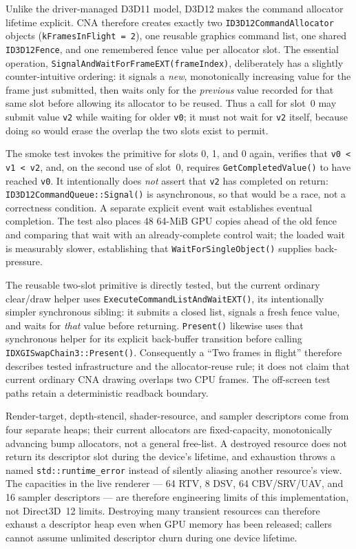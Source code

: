 Unlike the driver-managed D3D11 model, D3D12 makes the command allocator lifetime explicit.
CNA therefore creates exactly two \texttt{ID3D12CommandAllocator} objects
(\texttt{kFramesInFlight = 2}), one reusable graphics command list, one shared
\texttt{ID3D12Fence}, and one remembered fence value per allocator slot.  The essential
operation, \texttt{SignalAndWaitForFrameEXT(\allowbreak{}frameIndex)}, deliberately has a slightly
counter-intuitive ordering: it signals a \emph{new}, monotonically increasing value for the
frame just submitted, then waits only for the \emph{previous} value recorded for that same
slot before allowing its allocator to be reused.  Thus a call for slot~0 may submit value
\texttt{v2} while waiting for older \texttt{v0}; it must not wait for \texttt{v2} itself,
because doing so would erase the overlap the two slots exist to permit.

The smoke test invokes the primitive for slots 0, 1, and 0 again, verifies
that \texttt{v0 < v1 < v2}, and, on the second use of slot~0, requires
\texttt{GetCompletedValue()} to have reached \texttt{v0}.  It intentionally does \emph{not}
assert that \texttt{v2} has completed on return: \texttt{ID3D12CommandQueue::Signal()} is
asynchronous, so that would be a race, not a correctness condition.  A separate explicit
event wait establishes eventual completion. The test also places 48
64-MiB GPU copies ahead of the old fence and comparing that wait with an already-complete
control wait; the loaded wait is measurably slower, establishing that
\texttt{WaitForSingleObject()} supplies back-pressure.

The reusable two-slot primitive is directly tested, but the current ordinary clear/draw helper
uses \texttt{ExecuteCommandListAndWaitEXT()}, its intentionally simpler synchronous sibling:
it submits a closed list, signals a fresh fence value, and waits for \emph{that} value before
returning.  \texttt{Present()} likewise uses that synchronous helper for its explicit
back-buffer transition before calling \texttt{IDXGISwapChain3::Present()}.  Consequently a
``Two frames in flight'' therefore describes tested infrastructure and the allocator-reuse rule;
it does not claim that current ordinary CNA drawing overlaps two CPU frames. The off-screen test
paths retain a deterministic readback boundary.

Render-target,
depth-stencil, shader-resource, and sampler descriptors come from four separate heaps; their
current allocators are fixed-capacity, monotonically advancing bump allocators, not a general
free-list.  A destroyed resource does not return its descriptor slot during the device's
lifetime, and exhaustion throws a named \texttt{std::runtime\_error} instead of silently
aliasing another resource's view.  The capacities in the live renderer --- 64 RTV, 8 DSV,
64 CBV/SRV/UAV, and 16 sampler descriptors --- are therefore engineering limits of this
implementation, not Direct3D~12 limits. Destroying many transient resources can therefore
exhaust a descriptor heap even when GPU memory has been released; callers cannot assume
unlimited descriptor churn during one device lifetime.

